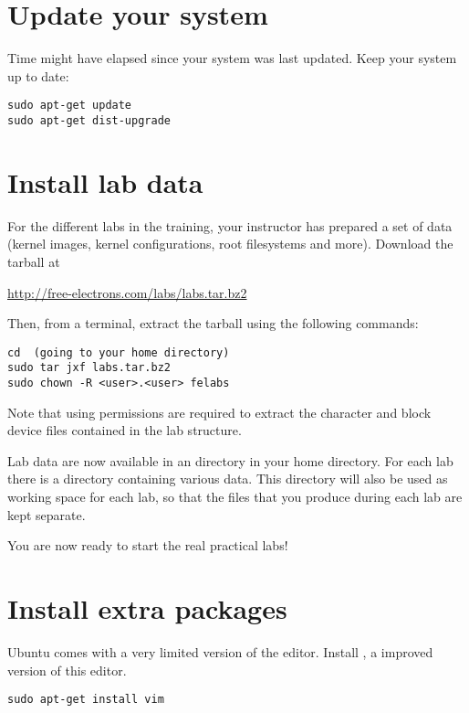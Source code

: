 
\section{Update your system}

Time might have elapsed since your system was last updated. Keep your
system up to date:

\begin{verbatim}
sudo apt-get update
sudo apt-get dist-upgrade
\end{verbatim}

\section{Install lab data}

For the different labs in the training, your instructor has prepared a
set of data (kernel images, kernel configurations, root filesystems
and more). Download the tarball at

\url{http://free-electrons.com/labs/labs.tar.bz2}

Then, from a terminal, extract the tarball using the following
commands:

\begin{verbatim}
cd	(going to your home directory)
sudo tar jxf labs.tar.bz2
sudo chown -R <user>.<user> felabs
\end{verbatim}

Note that using  permissions are required to extract the
character and block device files contained in the lab structure.

Lab data are now available in an  directory in your home
directory. For each lab there is a directory containing various
data. This directory will also be used as working space for each lab,
so that the files that you produce during each lab are kept separate.

You are now ready to start the real practical labs!

\section{Install extra packages}

Ubuntu comes with a very limited version of the 
editor. Install , a improved version of this editor.

\begin{verbatim}
sudo apt-get install vim
\end{verbatim}


